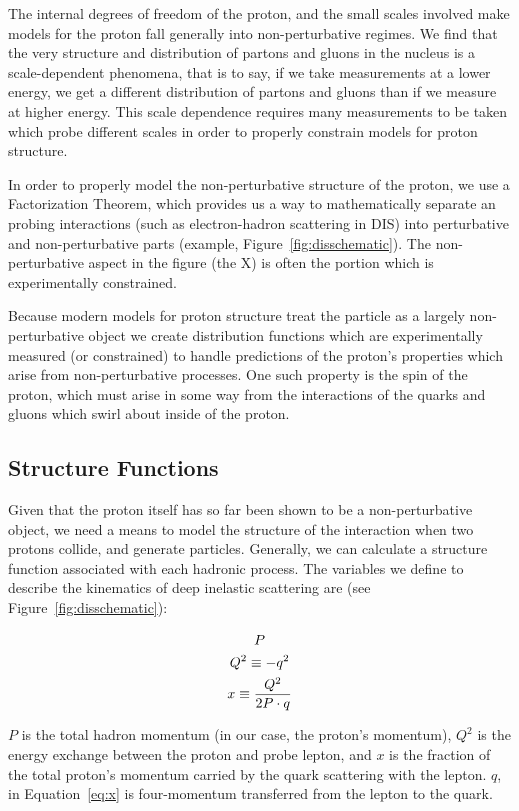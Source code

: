 The internal degrees of freedom of the proton, and the small scales involved
make models for the proton fall generally into non-perturbative regimes. We find
that the very structure and distribution of partons and gluons in the nucleus is
a scale-dependent phenomena, that is to say, if we take measurements at a lower
energy, we get a different distribution of partons and gluons than if we measure
at higher energy. This scale dependence requires many measurements to be taken
which probe different scales in order to properly constrain models for proton
structure. 

In order to properly model the non-perturbative structure of the proton, we use
a Factorization Theorem, which provides us a way to mathematically separate an
probing interactions (such as electron-hadron scattering in DIS) into
perturbative and non-perturbative parts (example,
Figure~\ref{fig:disschematic}). The non-perturbative aspect in the figure (the
X) is often the portion which is experimentally constrained.

Because modern models for proton structure treat the particle as a largely
non-perturbative object we create distribution functions which are
experimentally measured (or constrained) to handle predictions of the proton's
properties which arise from non-perturbative processes. One such property is the
spin of the proton, which must arise in some way from the interactions of the
quarks and gluons which swirl about inside of the proton.

\subsection{Structure Functions}
\label{sec:structure_functions}

Given that the proton itself has so far been shown to be a non-perturbative
object, we need a means to model the structure of the interaction when two
protons collide, and generate particles.  Generally, we can calculate a
structure function associated with each hadronic process. The variables we
define to describe the kinematics of deep inelastic scattering are (see
Figure~\ref{fig:disschematic}):

\begin{gather}
  P \label{eq:P}\\
  Q^2 \equiv -q^2 \label{eq:big_q_sq}\\
    x \equiv { Q^2 \over {2P\cdot q} } \label{eq:x}
\end{gather}

$P$ is the total hadron momentum (in our case, the proton's momentum), $Q^2$ is
the energy exchange between the proton and probe lepton, and $x$ is the fraction
of the total proton's momentum carried by the quark scattering with the lepton.
$q$, in Equation~\ref{eq:x} is four-momentum transferred from the lepton to the
quark. 

